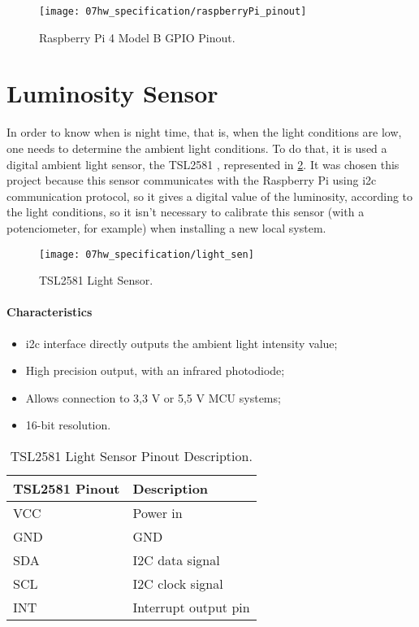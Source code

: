 \begin{figure}[H]
	\centering
	\texttt{[image: 07hw\_specification/raspberryPi\_pinout]}
	\caption{Raspberry Pi 4 Model B GPIO Pinout.}
	\label{fig:rasp_pinout}
\end{figure}

\section{Luminosity Sensor}

In order to know when is night time, that is, when the light conditions are low, one needs to determine the ambient light conditions. To do that, it is used a digital ambient light sensor, the TSL2581 \cite{light_sensor}, represented in \ref{fig:light_sen}. It was chosen this project because this sensor communicates with the Raspberry Pi using \ac{i2c} communication protocol, so it gives a digital value of the luminosity, according to the light conditions, so it isn't necessary to calibrate this sensor (with a potenciometer, for example) when installing a new local system.

\begin{figure}[H]
	\centering
	\texttt{[image: 07hw\_specification/light\_sen]}
	\caption{TSL2581 Light Sensor.}
	\label{fig:light_sen}
\end{figure}

\paragraph*{Characteristics}
\begin{itemize}
	\item \ac{i2c} interface directly outputs the ambient light intensity value;
	\item High precision output, with an infrared photodiode;
	\item Allows connection to 3,3 V or 5,5 V MCU systems;
	\item 16-bit resolution.
\end{itemize}

\begin{table}[H]
	\centering
	\begin{tabular}{|m{5cm}|m{6cm}|}
		\hline
		\textbf{TSL2581 Pinout} & \textbf{Description}
		\\\hline\hline
		VCC & Power in
		\\\hline
		GND & GND
		\\\hline
		SDA & I2C data signal
		\\\hline
		SCL & I2C clock signal
		\\\hline
		INT & Interrupt output pin
		\\\hline
	\end{tabular}
	
	\caption{TSL2581 Light Sensor Pinout Description.}
	\label{table:desc_lightsensor}
\end{table}

